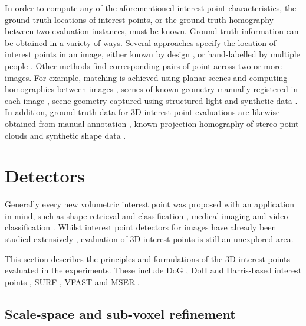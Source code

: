 In order to compute any of the aforementioned interest point characteristics, the ground truth locations of interest points, or the ground truth homography between two evaluation instances, must be known. Ground truth information can be obtained in a variety of ways.  
Several approaches specify the location of interest points in an image, either known by design \cite{Rajan1989}, or hand-labelled by multiple people \cite{Heath1997}. 
Other methods find corresponding pairs of point across two or more images. For example, matching is achieved using planar scenes and computing homographies between images \cite{Schmid2000}, scenes of known geometry manually registered in each image \cite{Rosten2010}, scene geometry captured using structured light \cite{Aanaes2012} and synthetic data \cite{Laptev2005}. 
In addition, ground truth data for 3D interest point evaluations are likewise obtained from manual annotation \cite{Dutagaci2011}, known projection homography of stereo point clouds \cite{Aanaes2012} and synthetic shape data \cite{Salti2011}. 

\section{Detectors}
\label{sec/eval/detectors}

Generally every new volumetric interest point was proposed with an application in mind, such as shape retrieval and classification \cite{Riemenschneider2009,Flitton2010,Knopp2010,Prasad2011}, medical imaging \cite{Criminisi2011,Ni2008,Donner2011} and video classification \cite{Willems2009,Laptev2005,Yu2010}. 
Whilst interest point detectors for images have already been studied extensively \cite{Mikolajczyk2005, Tuytelaars2008}, evaluation of 3D interest points is still an unexplored area. 

This section describes the principles and formulations of the 3D interest points evaluated in the experiments. These include DoG \cite{Flitton2010, Pham2011}, DoH and Harris-based interest points \cite{Laptev2005}, SURF \cite{Willems2008, Knopp2010}, VFAST \cite{Yu2010} and MSER \cite{Donoser2006, Riemenschneider2009}. 

\subsection{Scale-space and sub-voxel refinement}
\label{sec/eval/subvoxel}

